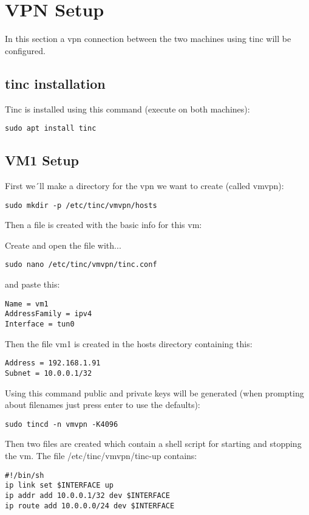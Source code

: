 \documentclass[10pt,a4paper]{article}
\begin{document}
\newpage
\section{VPN Setup}
In this section a vpn connection between the two machines using tinc will be configured.

\subsection{tinc installation}
Tinc is installed using this command (execute on both machines):
\begin{verbatim}
sudo apt install tinc
\end{verbatim}

\subsection{VM1 Setup}
First we´ll make a directory for the vpn we want to create (called vmvpn):
\begin{verbatim}
sudo mkdir -p /etc/tinc/vmvpn/hosts
\end{verbatim}

Then a file is created with the basic info for this vm:

Create and open the file with...
\begin{verbatim}
sudo nano /etc/tinc/vmvpn/tinc.conf
\end{verbatim}
and paste this:
\begin{verbatim}
Name = vm1
AddressFamily = ipv4
Interface = tun0
\end{verbatim}

Then the file vm1 is created in the hosts directory containing this:
\begin{verbatim}
Address = 192.168.1.91
Subnet = 10.0.0.1/32
\end{verbatim}

Using this command public and private keys will be generated (when prompting about filenames just press enter to use the defaults):
\begin{verbatim}
sudo tincd -n vmvpn -K4096
\end{verbatim}

Then two files are created which contain a shell script for starting and stopping the vm. The file /etc/tinc/vmvpn/tinc-up contains:
\begin{verbatim}
#!/bin/sh
ip link set $INTERFACE up
ip addr add 10.0.0.1/32 dev $INTERFACE
ip route add 10.0.0.0/24 dev $INTERFACE
\end{verbatim}
\end{document}
